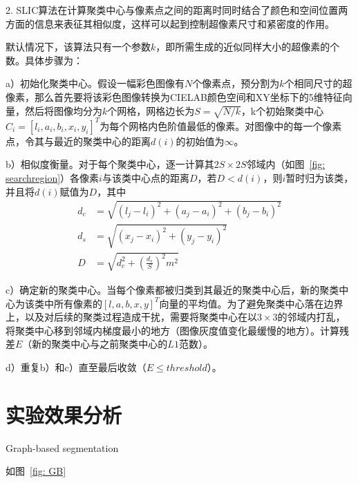 \documentclass[12pt]{article}
\begin{document}
2. SLIC算法在计算聚类中心与像素点之间的距离时同时结合了颜色和空间位置两方面的信息来表征其相似度，这样可以起到控制超像素尺寸和紧密度的作用。

默认情况下，该算法只有一个参数$k$，即所需生成的近似同样大小的超像素的个数。具体步骤为：

a）初始化聚类中心。假设一幅彩色图像有$N$个像素点，预分割为$k$个相同尺寸的超像素，那么首先要将该彩色图像转换为CIELAB颜色空间和XY坐标下的5维特征向量，然后将图像均分为$k$个网格，网格边长为$S=\sqrt{N/k}$，k个初始聚类中心$C_i=[l_i, a_i, b_i, x_i, y_i]^T$为每个网格内色阶值最低的像素。对图像中的每一个像素点，令其与最近的聚类中心的距离$d(i)$的初始值为$\infty$。

b）相似度衡量。对于每个聚类中心，逐一计算其$2S \times 2S$邻域内（如图~\ref{fig: searchregion}）各像素$i$与该类中心点的距离$D$，若$D<d(i)$，则$i$暂时归为该类，并且将$d(i)$赋值为$D$，其中
\begin{align}
d_c & =  \sqrt{(l_j-l_i)^2+(a_j-a_i)^2+(b_j-b_i)^2}\\
d_s & =  \sqrt{(x_j-x_i)^2+(y_j-y_i)^2}\\
D & =  \sqrt{d_c^2+\left(\frac{d_s}{S}\right)^2m^2}
\end{align}

c）确定新的聚类中心。当每个像素都被归类到其最近的聚类中心后，新的聚类中心为该类中所有像素的$[l, a, b, x, y]^T$向量的平均值。为了避免聚类中心落在边界上，以及对后续的聚类过程造成干扰，需要将聚类中心在以$3\times3$的邻域内打乱，将聚类中心移到邻域内梯度最小的地方（图像灰度值变化最缓慢的地方）。计算残差$E$（新的聚类中心与之前聚类中心的$L1$范数）。

d）重复b）和c）直至最后收敛（$E\le threshold$）。

\section{实验效果分析}

Graph-based segmentation

如图~\ref{fig: GB}
\end{document}
